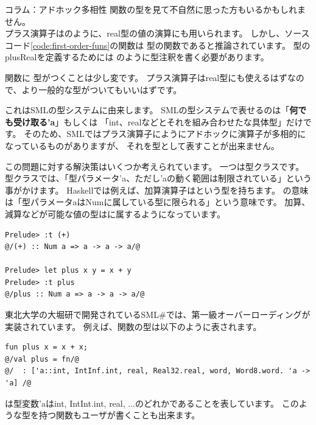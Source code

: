 \documentclass[11pt,a4paper]{article}
\begin{document}
\begin{itembox}[l]{コラム：アドホック多相性}
関数の型を見て不自然に思った方もいるかもしれません。\\
プラス演算子はのように、real型の値の演算にも用いられます。
しかし、ソースコード\ref{code:first-order-funs}の関数は
型の関数であると推論されています。
型のplusRealを定義するためには
のように型注釈を書く必要があります。

関数に
型がつくことは少し変です。
プラス演算子はreal型にも使えるはずなので、より一般的な型がついてもいいはずです。

これはSMLの型システムに由来します。
SMLの型システムで表せるのは「\textbf{何でも受け取る'a}」もしくは
「int、realなどとそれを組み合わせたな具体型」だけです。
そのため、SMLではプラス演算子にようにアドホックに演算子が多相的になっているものがありますが、
それを型として表すことが出来ません。

この問題に対する解決策はいくつか考えられています。
一つは型クラスです。型クラスでは、「型パラメータ'a、ただし'aの動く範囲は制限されている」という事がかけます。
Haskellでは例えば、加算演算子はという型を持ちます。
の意味は「型パラメータaはNumに属している型に限られる」という意味です。
加算、減算などが可能な値の型はに属するようになっています。

\begin{lstlisting}[caption=Haskellでのplusの型付け]
Prelude> :t (+)
@/(+) :: Num a => a -> a -> a/@

Prelude> let plus x y = x + y
Prelude> :t plus
@/plus :: Num a => a -> a -> a/@
\end{lstlisting}

東北大学の大堀研で開発されているSML\#\cite{smlsharp}では、第一級オーバーローディングが実装されています。
例えば、関数の型は以下のように表されます。
\begin{lstlisting}[caption=SML\#でのplusの型付け]
fun plus x = x + x;
@/val plus = fn/@
@/  : ['a::int, IntInf.int, real, Real32.real, word, Word8.word. 'a -> 'a] /@
\end{lstlisting}
は型変数'aはint, IntInt.int, real, ...のどれかであることを表しています。
このような型を持つ関数もユーザが書くことも出来ます。

\end{itembox}
\end{document}
